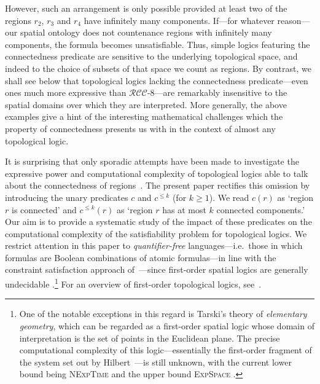 \documentclass{LMCS}
\theoremstyle{plain}
\newcommand{\RCCE}{\ensuremath{\mathcal{RCC}\text{-}8}}\newcommand{\RCCEcc}{\ensuremath{\RCCE{}cc}}\newcommand{\RCCEc}{\ensuremath{\RCCE{}c}}
\newcommand{\NExpTime}{\textsc{NExpTime}}
\begin{document}
However, such an arrangement is only possible provided at least two of
the regions $r_2$, $r_3$ and $r_4$ have infinitely many
components. If---for whatever reason---our spatial ontology does not
countenance regions with infinitely many components, the formula
becomes unsatisfiable. Thus, simple logics featuring the connectedness
predicate are sensitive to the underlying topological space, and
indeed to the choice of subsets of that space we count as regions. By
contrast, we shall see below that topological logics lacking the
connectedness predicate---even ones much more expressive than
$\RCCE$---are remarkably insensitive to the spatial domains over which
they are interpreted. More generally, the above examples give a hint
of the interesting mathematical challenges which the property of
connectedness presents us with in the context of almost any
topological logic.

It is surprising that only sporadic attempts have been made to
investigate the expressive power and computational complexity of
topological logics able to talk about the connectedness of
regions~\cite{cc94,Shehtman99,Wolter&Z00ecai,PrattHartmann02}.  The
present paper rectifies this omission by introducing the unary
predicates $c$ and $c^{\leq k}$ (for $k \geq 1$).
We read $c(r)$ as
`region $r$ is connected' and $c^{\le k}(r)$ as `region $r$ has at
most $k$ connected components.' Our aim is to provide a systematic
study of the impact of these predicates on the computational
complexity of the satisfiability problem for topological logics.  We
restrict attention in this paper to {\em quantifier-free}
languages---i.e.~those in which formulas are Boolean combinations of
atomic formulas---in line with the constraint satisfaction approach
of~\cite{Renz&Nebel07}---since first-order spatial logics are
generally undecidable
\cite{KK:Grzegorczyk51,KK:Dornheim98kr,Davis06,Lutz&WolterLMCS}.\footnote{One
  of the notable exceptions in this regard is Tarski's theory of {\em
    elementary geometry}, which can be regarded as a first-order
  spatial logic whose domain of interpretation is the set of points in
  the Euclidean plane. The precise computational complexity of this
  logic---essentially the first-order fragment of the system set out
  by Hilbert~\cite{hilbert09}---is still unknown, with the current
  lower bound being \NExpTime{} \cite{Fischer&Rabin74} and the upper
  bound \textsc{ExpSpace} \cite{expspace}.}  For an overview of
first-order topological logics, see~\cite{PH:HSL}.
\end{document}
